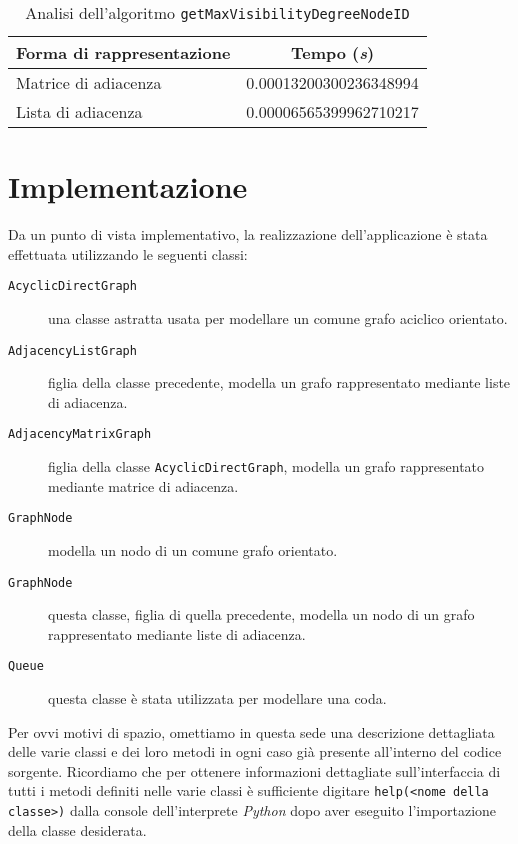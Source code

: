 \documentclass[10pt,a4paper,titlepage]{article}
\begin{document}
\begin{table}
\caption{Analisi dell'algoritmo \texttt{getMaxVisibilityDegreeNodeID}}\label{table:diana}
\begin{center}
\begin{tabular}{lc}

\toprule
Forma di rappresentazione & Tempo (\textit{s}) \\

\midrule

Matrice di adiacenza & 0.00013200300236348994 \\
Lista di adiacenza & 0.00006565399962710217 \\

\bottomrule
\end{tabular}
\end{center}
\end{table}


\section{Implementazione}

Da un punto di vista implementativo, la realizzazione dell'applicazione è stata effettuata utilizzando le seguenti classi:

\begin{description}
\item[\texttt{AcyclicDirectGraph}] una classe astratta usata per modellare un comune grafo aciclico orientato.
\item[\texttt{AdjacencyListGraph}] figlia della classe precedente, modella un grafo rappresentato mediante liste di adiacenza.
\item[\texttt{AdjacencyMatrixGraph}] figlia della classe \texttt{AcyclicDirectGraph}, modella un grafo rappresentato mediante matrice di adiacenza.
\item[\texttt{GraphNode}] modella un nodo di un comune grafo orientato.
\item[\texttt{GraphNode}] questa classe, figlia di quella precedente, modella un nodo di un grafo rappresentato mediante liste di adiacenza.
\item[\texttt{Queue}] questa classe è stata utilizzata per modellare una coda.

\end{description}
 
Per ovvi motivi di spazio, omettiamo in questa sede una descrizione dettagliata delle varie classi e dei loro metodi in ogni caso già presente all'interno del codice sorgente. Ricordiamo che per ottenere informazioni dettagliate sull'interfaccia di tutti i metodi definiti nelle varie classi è sufficiente digitare \texttt{help(<nome della classe>)} dalla console dell'interprete \textit{Python} dopo aver eseguito l'importazione della classe desiderata.
\end{document}

